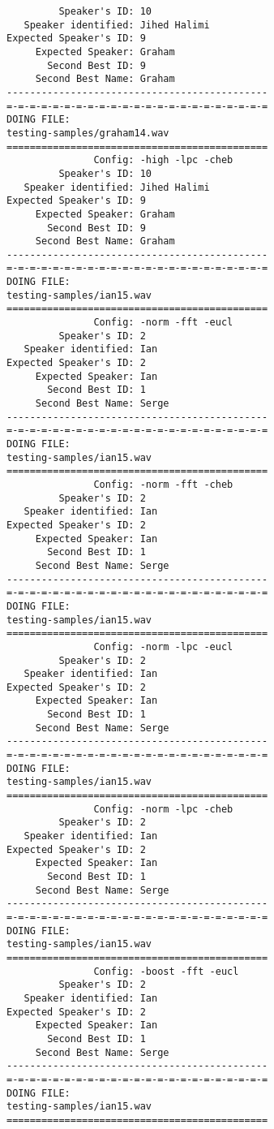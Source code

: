 \begin{verbatim}
         Speaker's ID: 10
   Speaker identified: Jihed Halimi
Expected Speaker's ID: 9
     Expected Speaker: Graham
       Second Best ID: 9
     Second Best Name: Graham
---------------------------------------------
=-=-=-=-=-=-=-=-=-=-=-=-=-=-=-=-=-=-=-=-=-=-=
DOING FILE:
testing-samples/graham14.wav
=============================================
               Config: -high -lpc -cheb
         Speaker's ID: 10
   Speaker identified: Jihed Halimi
Expected Speaker's ID: 9
     Expected Speaker: Graham
       Second Best ID: 9
     Second Best Name: Graham
---------------------------------------------
=-=-=-=-=-=-=-=-=-=-=-=-=-=-=-=-=-=-=-=-=-=-=
DOING FILE:
testing-samples/ian15.wav
=============================================
               Config: -norm -fft -eucl
         Speaker's ID: 2
   Speaker identified: Ian
Expected Speaker's ID: 2
     Expected Speaker: Ian
       Second Best ID: 1
     Second Best Name: Serge
---------------------------------------------
=-=-=-=-=-=-=-=-=-=-=-=-=-=-=-=-=-=-=-=-=-=-=
DOING FILE:
testing-samples/ian15.wav
=============================================
               Config: -norm -fft -cheb
         Speaker's ID: 2
   Speaker identified: Ian
Expected Speaker's ID: 2
     Expected Speaker: Ian
       Second Best ID: 1
     Second Best Name: Serge
---------------------------------------------
=-=-=-=-=-=-=-=-=-=-=-=-=-=-=-=-=-=-=-=-=-=-=
DOING FILE:
testing-samples/ian15.wav
=============================================
               Config: -norm -lpc -eucl
         Speaker's ID: 2
   Speaker identified: Ian
Expected Speaker's ID: 2
     Expected Speaker: Ian
       Second Best ID: 1
     Second Best Name: Serge
---------------------------------------------
=-=-=-=-=-=-=-=-=-=-=-=-=-=-=-=-=-=-=-=-=-=-=
DOING FILE:
testing-samples/ian15.wav
=============================================
               Config: -norm -lpc -cheb
         Speaker's ID: 2
   Speaker identified: Ian
Expected Speaker's ID: 2
     Expected Speaker: Ian
       Second Best ID: 1
     Second Best Name: Serge
---------------------------------------------
=-=-=-=-=-=-=-=-=-=-=-=-=-=-=-=-=-=-=-=-=-=-=
DOING FILE:
testing-samples/ian15.wav
=============================================
               Config: -boost -fft -eucl
         Speaker's ID: 2
   Speaker identified: Ian
Expected Speaker's ID: 2
     Expected Speaker: Ian
       Second Best ID: 1
     Second Best Name: Serge
---------------------------------------------
=-=-=-=-=-=-=-=-=-=-=-=-=-=-=-=-=-=-=-=-=-=-=
DOING FILE:
testing-samples/ian15.wav
=============================================

\end{verbatim}

